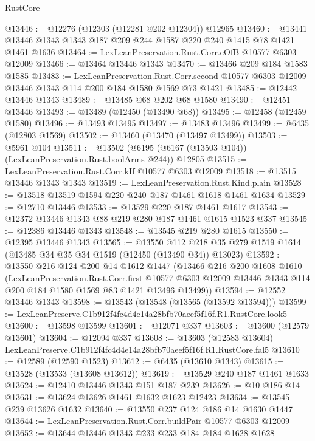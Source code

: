 \begin{lexlean}{RustCore}
\begin{coremodule}
@13446 := @12276 (@12303 (@12281 @202 @12304)) @12965
@13460 := @13441 @13446 @1343 @1343 @187 @209 @244 @1587 @220 @240 @1415 @78 @1421 @1461 @1636
@13464 := LexLeanPreservation.Rust.Corr.eOfB @10577 @6303 @12009
@13466 := @13464 @13446 @1343
@13470 := @13466 @209 @184 @1583 @1585
@13483 := LexLeanPreservation.Rust.Corr.second
    @10577
    @6303
    @12009
    @13446
    @1343
    @114
    @200
    @184
    @1580
    @1569
    @73
    @1421
@13485 := @12442 @13446 @1343
@13489 := @13485 @68 @202 @68 @1580
@13490 := @12451 @13446
@13493 := @13489 (@12450 (@13490 @68))
@13495 := @12458 (@12459 @1580)
@13496 := @13493 @13495
@13497 := @13483 @13496
@13499 := @6435 (@12803 @1569)
@13502 := @13460 (@13470 (@13497 @13499))
@13503 := @5961 @104
@13511 := @13502 (@6195 (@6167 (@13503 @104)) (LexLeanPreservation.Rust.boolArms @244)) @12805
@13515 := LexLeanPreservation.Rust.Corr.kIf @10577 @6303 @12009
@13518 := @13515 @13446 @1343 @1343
@13519 := LexLeanPreservation.Rust.Kind.plain
@13528 := @13518 @13519 @1594 @220 @240 @187 @1461 @1618 @1461 @1634
@13529 := @12710 @13446
@13533 := @13529 @220 @187 @1461 @1617
@13543 := @12372 @13446 @1343 @88 @219 @280 @187 @1461 @1615 @1523 @337
@13545 := @12386 @13446 @1343
@13548 := @13545 @219 @280 @1615
@13550 := @12395 @13446 @1343
@13565 := @13550
    @112
    @218
    @35
    @279
    @1519
    @1614
    (@13485 @34 @35 @34 @1519 (@12450 (@13490 @34)) @13023)
@13592 := @13550
    @216
    @124
    @200
    @14
    @1612
    @1447
    (@13466
      @216
      @200
      @1608
      @1610
      (LexLeanPreservation.Rust.Corr.first
        @10577
        @6303
        @12009
        @13446
        @1343
        @114
        @200
        @184
        @1580
        @1569
        @83
        @1421
        @13496
        @13499))
@13594 := @12552 @13446 @1343
@13598 := @13543 (@13548 (@13565 (@13592 @13594)))
@13599 := LexLeanPreserve.C1b912f4fc4d4e14a28bfb70aeef5f16f.R1.RustCore.look5
@13600 := @13598 @13599
@13601 := @12071 @337
@13603 := @13600 (@12579 @13601)
@13604 := @12094 @337
@13608 := @13603 (@12583 @13604) LexLeanPreserve.C1b912f4fc4d4e14a28bfb70aeef5f16f.R1.RustCore.fal5
@13610 := @12589 (@12590 @1523)
@13612 := @6435 (@13610 @1343)
@13615 := @13528 (@13533 (@13608 @13612))
@13619 := @13529 @240 @187 @1461 @1633
@13624 := @12410 @13446 @1343 @151 @187 @239
@13626 := @10 @186 @14
@13631 := @13624 @13626 @1461 @1632 @1623 @12423
@13634 := @13545 @239 @13626 @1632
@13640 := @13550 @237 @124 @186 @14 @1630 @1447
@13644 := LexLeanPreservation.Rust.Corr.buildPair @10577 @6303 @12009
@13652 := @13644 @13446 @1343 @233 @233 @184 @184 @1628 @1628

\end{coremodule}
\end{lexlean}
